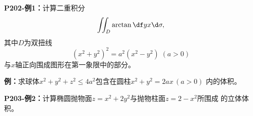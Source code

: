 {\bf P202-例1：}计算二重积分
$$\iint_D\arctan\df yx\d\sigma,$$
其中$D$为双扭线
$$(x^2+y^2)^2=a^2(x^2-y^2)\;(a>0)$$
与$x$轴正向围成图形在第一象限中的部分。

{\bf 例：}求球体$x^2+y^2+z^2\leq 4a^2$包含在圆柱$x^2+y^2=2ax\,(a>0)$
内的体积。

\begin{center}
\end{center}

{\bf P203-例2：}计算椭圆抛物面$z=x^2+2y^2$与抛物柱面$z=2-x^2$所围成
的立体体积。

\begin{center}
\end{center}

